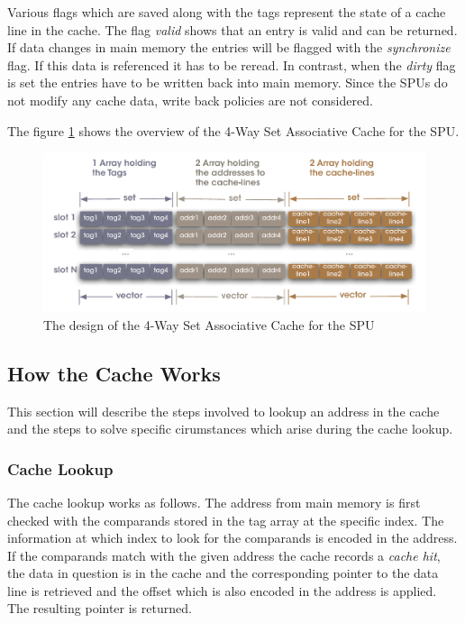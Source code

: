 \documentclass[DIV10, abstracton, openright, footsepline, headsepline, twoside, 9pt,
bigheadings]{scrreprt}
\begin{document}
Various flags which are saved along with the tags represent the state of a
cache line in the cache. The flag \textit{valid} shows that an entry is valid
and can be returned. If data changes in main memory the entries will be flagged
with the \textit{synchronize} flag. If this data is referenced it has to be
reread. In contrast, when the \textit{dirty} flag is set the entries have to be written
back into main memory. Since the SPUs do not modify any cache data, write back
policies are not considered.

The figure \ref{fig:cache_design_rough} shows the overview of the 4-Way Set
Associative Cache for the SPU.

\begin{figure}[H]
\centering
\includegraphics[width=\textwidth]{diagramme/cache_design}
\caption{The design of the 4-Way Set Associative Cache for the SPU}
\label{fig:cache_design_rough}
\end{figure}


\subsection{How the Cache Works}
This section will describe the steps involved to lookup an address in the cache
and the steps to solve specific cirumstances which arise during the cache lookup.
\subsubsection{Cache Lookup}
The cache lookup works as follows. The address from main memory is first
checked with the comparands stored in the tag array at the specific index. The
information at which index to look for the comparands is encoded in the address.
If the comparands match with the given address the cache records a
\textit{cache hit}, the data in question is in the cache and the corresponding
pointer to the data line is retrieved and the offset which is also encoded in
the address is applied. The resulting pointer is returned.
\end{document}

